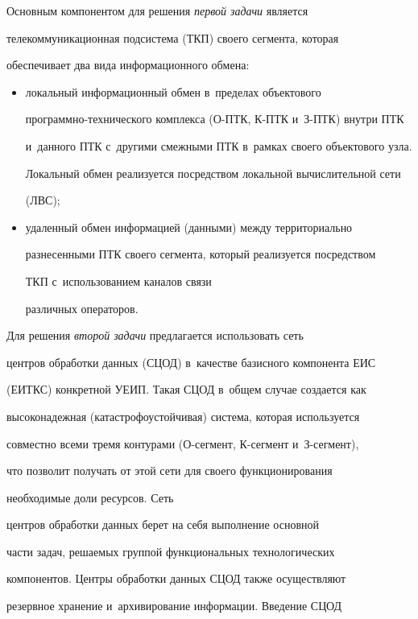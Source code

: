      Основным компонентом для решения \textit{первой задачи} является 

телекоммуникационная подсистема (ТКП) своего сегмента, которая 

обеспечивает два вида информационного обмена:

     \begin{itemize}

     \item[(а)] локальный информационный обмен в~пределах объектового 

программно-технического комплекса (О-ПТК, К-ПТК и~З-ПТК) внутри ПТК 

и~данного ПТК с~другими смежными ПТК в~рамках своего объектового узла. 

Локальный обмен реализуется посредством локальной вычислительной сети 

(ЛВС);

     \item[(б)] удаленный обмен информацией (данными) между территориально 

разнесенными ПТК своего сегмента, который реализуется посредством 

ТКП с~использованием каналов связи 

различных операторов.

     \end{itemize}

     

     Для решения \textit{второй задачи} предлагается использовать сеть 

центров обработки данных (СЦОД) в~качестве базисного компонента ЕИС 

(ЕИТКС) конкретной УЕИП. Такая СЦОД в~общем случае создается как 

высоконадежная (катастрофоустойчивая) система, которая используется 

совместно всеми тремя контурами (О-сег\-мент, К-сег\-мент и~З-сег\-мент), 

что позволит получать от этой сети для своего функционирования 

необходимые доли ресурсов. Сеть 

центров обработки данных берет на себя выполнение основной 

части задач, решаемых группой функциональных технологических 

компонентов. Центры обработки данных СЦОД также осуществляют 

резервное хранение и~архивирование информации. Введение СЦОД 

